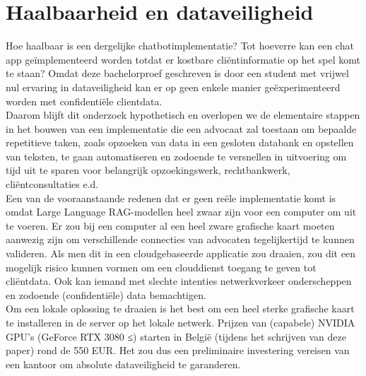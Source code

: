\chapter{Haalbaarheid en dataveiligheid}
\label{ch:feasability}
Hoe haalbaar is een dergelijke chatbotimplementatie? 
Tot hoeverre kan een chat app geïmplementeerd worden totdat er kostbare cliëntinformatie op het spel komt te staan? 
Omdat deze bachelorproef geschreven is door een student met vrijwel nul ervaring in dataveiligheid kan er op geen enkele manier geëxperimenteerd worden met confidentiële clientdata. \\ 

Daarom blijft dit onderzoek hypothetisch en overlopen we de elementaire stappen in het bouwen van een implementatie die een advocaat zal toestaan om bepaalde repetitieve taken, 
zoals opzoeken van data in een gesloten databank en opstellen van teksten, te gaan automatiseren en zodoende te versnellen in uitvoering om tijd uit te sparen voor belangrijk opzoekingswerk, 
rechtbankwerk, cliëntconsultaties e.d.\\ 

Een van de vooraanstaande redenen dat er geen reële implementatie komt is omdat Large Language RAG-modellen heel zwaar zijn voor een computer om uit te voeren. 
Er zou bij een computer al een heel zware grafische kaart moeten aanwezig zijn om verschillende connecties van advocaten tegelijkertijd te kunnen valideren. 
Als men dit in een cloudgebaseerde applicatie zou draaien, zou dit een mogelijk risico kunnen vormen om een clouddienst toegang te geven tot cliëntdata.
Ook kan iemand met slechte intenties netwerkverkeer onderscheppen en zodoende (confidentiële) data bemachtigen. \\ 

Om een lokale oplossing te draaien is het best om een heel sterke grafische kaart te installeren in de server op het lokale netwerk. 
Prijzen van (capabele) NVIDIA GPU's (GeForce RTX 3080 ≤) starten in België (tijdens het schrijven van deze paper) rond de 550 EUR. 
Het zou dus een preliminaire investering vereisen van een kantoor om absolute dataveiligheid te garanderen. 
